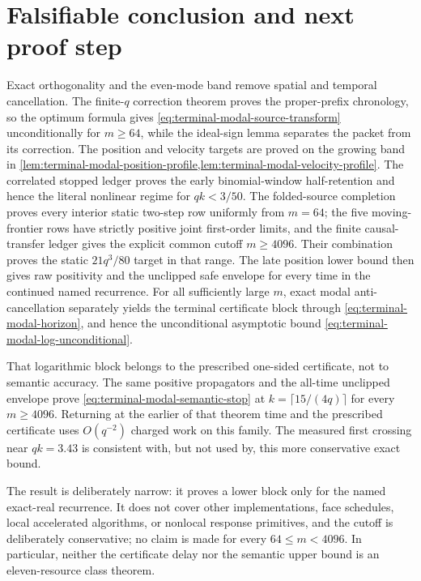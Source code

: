 \section{Falsifiable conclusion and next proof step}
\label{sec:terminal-modal-conclusion}

Exact orthogonality and the even-mode band remove spatial and temporal
cancellation.  The finite-$q$ correction theorem proves the proper-prefix
chronology, so the optimum formula gives
\eqref{eq:terminal-modal-source-transform} unconditionally for $m\ge64$,
while the ideal-sign lemma separates the packet from its correction.  The
position and velocity targets are proved on the growing band in
\cref{lem:terminal-modal-position-profile,lem:terminal-modal-velocity-profile}.
The correlated stopped ledger proves the early binomial-window half-retention
and hence the literal nonlinear regime for $qk<3/50$.  The folded-source
completion proves every interior static two-step row uniformly from $m=64$;
the five moving-frontier rows have strictly positive joint first-order
limits, and the finite causal-transfer ledger gives the explicit common
cutoff $m\ge4096$.  Their combination proves the static $21q^3/80$ target in
that range.  The late position lower bound then gives raw positivity and the
unclipped safe envelope for every time in the continued named recurrence.
For all sufficiently large $m$, exact modal anti-cancellation separately
yields the terminal certificate block through
\eqref{eq:terminal-modal-horizon}, and hence the unconditional asymptotic bound
\eqref{eq:terminal-modal-log-unconditional}.

That logarithmic block belongs to the prescribed one-sided certificate, not
to semantic accuracy.  The same positive propagators and the all-time
unclipped envelope prove \eqref{eq:terminal-modal-semantic-stop} at
$k=\lceil15/(4q)\rceil$ for every $m\ge4096$.  Returning at the earlier of
that theorem time and the prescribed certificate uses $O(q^{-2})$ charged
work on this family.  The measured first crossing near $qk=3.43$ is
consistent with, but not used by, this more conservative exact bound.

The result is deliberately narrow: it proves a lower block only for the
named exact-real recurrence.  It does not cover other implementations, face
schedules, local accelerated algorithms, or nonlocal response primitives,
and the cutoff is deliberately conservative; no claim is made for every
$64\le m<4096$.  In particular, neither the certificate delay nor the
semantic upper bound is an eleven-resource class theorem.
